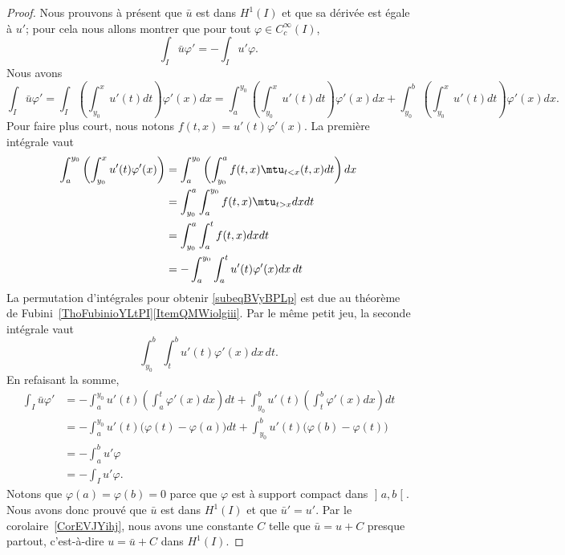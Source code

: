 \begin{proof}
    Nous prouvons à présent que \( \bar u\) est dans \( H^1(I)\) et que sa dérivée est égale à \( u'\); pour cela nous allons montrer que pour tout \( \varphi\in  C^{\infty}_c(I)\),
    \begin{equation}
        \int_I\bar u\varphi'=-\int_Iu'\varphi.
    \end{equation}
    Nous avons
    \begin{equation}
            \int_I\bar u\varphi'=\int_I\left( \int_{y_0}^xu'(t)dt\right)\varphi'(x)dx
            =\int_{a}^{y_0}\left( \int_{y_0}^xu'(t)dt\right)\varphi'(x)dx+\int_{y_0}^b\left( \int_{y_0}^xu'(t)dt\right)\varphi'(x)dx.
    \end{equation}
    Pour faire plus court, nous notons \( f(t,x)=u'(t)\varphi'(x)\). La première intégrale vaut
    \begin{subequations}
        \begin{align}
            \int_a^{y_0}\left( \int_{y_0}^x u'(t)\varphi'(x) \right)&=\int_a^{y_0}\left(\int_{y_0}^af(t,x)\mtu_{t<x}(t,x)dt\right)dx\\
            &=\int_{y_0}^a\int_a^{y_0}f(t,x)\mtu_{t>x}dxdt  \label{subeqBVyBPLp}\\
            &=\int_{y_0}^a\int_a^tf(t,x)dxdt\\
            &=-\int_a^{y_0}\int_a^tu'(t)\varphi'(x)dx\,dt
        \end{align}
    \end{subequations}
    La permutation d'intégrales pour obtenir \eqref{subeqBVyBPLp} est due au théorème de Fubini~\ref{ThoFubinioYLtPI}\ref{ItemQMWiolgiii}. Par le même petit jeu, la seconde intégrale vaut
    \begin{equation}
        \int_{y_0}^b\int_t^b u'(t)\varphi'(x)dx\,dt.
    \end{equation}
    En refaisant la somme,
    \begin{subequations}
        \begin{align}
            \int_I\bar u\varphi'
            &=-\int_a^{y_0}u'(t)\left( \int_a^t\varphi'(x)dx \right)dt+\int_{y_0}^bu'(t)\left( \int_t^b\varphi'(x)dx \right)dt\\
            &=-\int_a^{y_0}u'(t)\big( \varphi(t)-\varphi(a) \big)dt+\int_{y_0}^bu'(t)\big( \varphi(b)-\varphi(t) \big)\\
            &=-\int_a^bu'\varphi\\
            &=-\int_Iu'\varphi.
        \end{align}
    \end{subequations}
    Notons que \( \varphi(a)=\varphi(b)=0\) parce que \( \varphi\) est à support compact dans \( \mathopen] a , b \mathclose[\). Nous avons donc prouvé que \( \bar u\) est dans \( H^1(I)\) et que \( \bar u'=u'\). Par le corolaire~\ref{CorEVJYihj}, nous avons une constante \( C\) telle que \( \bar u=u+C\) presque partout, c'est-à-dire \( u=\bar u +C\) dans \( H^1(I)\).


\end{proof}

